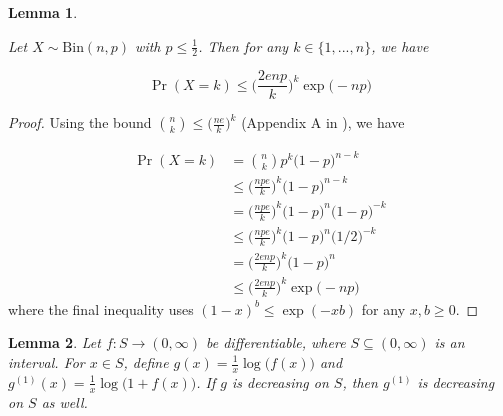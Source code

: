 \documentclass{article}
\newtheorem{lemma}{Lemma}
\begin{document}
\begin{lemma}\label{lemma:probXk}

Let $X \sim \text{Bin}(n, p)$ with $p \leq \frac12$. Then for any $k \in \{1, ..., n\}$, we have 

\[\Pr(X = k) \leq \Big(\frac{2enp}{k}\Big)^k\exp\big(-np\big)\]
    
\end{lemma}

\begin{proof}
    Using the bound ${n \choose k } \leq \big(\frac{ne}{k}\big)^k$ (Appendix A in \cite{roch2024modern}), we have 

    \begin{align*}
        \Pr(X = k) &= {n \choose k}p^k\big(1 - p\big)^{n - k} \\
        &\leq \Big(\frac{npe}{k}\Big)^k\big(1 - p\big)^{n - k} \\
        &=  \Big(\frac{npe}{k}\Big)^k\big(1 - p\big)^{n}\big(1 - p\big)^{-k} \\ 
        &\leq \Big(\frac{npe}{k}\Big)^k\big(1 - p\big)^{n}\big(1/2\big)^{-k} \\
        &= \Big(\frac{2enp}{k}\Big)^k\Big(1 - p\Big)^{n} \\
        &\leq \Big(\frac{2enp}{k}\Big)^k\exp\big(-np\big)
    \end{align*}
where the final inequality uses $(1 - x)^b \leq \exp(-xb)$ for any $x, b \geq 0$.
\end{proof}

\begin{lemma}\label{lemma:log-plus-one}
    Let $f : S \rightarrow (0,\infty)$ be differentiable, where $S \subseteq (0,\infty)$ is an interval. For $x \in S$, define $g(x) = \frac1x\log\big(f(x)\big)$ and $g^{(1)}(x) = \frac1x \log\big(1 + f(x)\big)$. If $g$ is decreasing on $S$, then $g^{(1)}$ is decreasing on $S$ as well.
\end{lemma}
\end{document}
